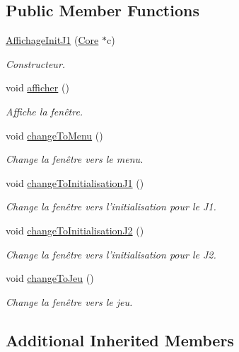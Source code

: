 \subsection*{Public Member Functions}
\begin{DoxyCompactItemize}
\item 
\hyperlink{classAffichageInitJ1_ac184edfaeebae278b71348584817cf3f}{Affichage\+Init\+J1} (\hyperlink{classCore}{Core} $\ast$c)
\begin{DoxyCompactList}\small\item\em Constructeur. \end{DoxyCompactList}\item 
void \hyperlink{classAffichageInitJ1_a469000a4072c712f88ee75ed6cc03d3b}{afficher} ()
\begin{DoxyCompactList}\small\item\em Affiche la fenêtre. \end{DoxyCompactList}\item 
void \hyperlink{classAffichageInitJ1_ac579f8933a11bc3e49923d414b20acab}{change\+To\+Menu} ()
\begin{DoxyCompactList}\small\item\em Change la fenêtre vers le menu. \end{DoxyCompactList}\item 
void \hyperlink{classAffichageInitJ1_a07ee576320b2bd22733ac142fd10b14c}{change\+To\+Initialisation\+J1} ()
\begin{DoxyCompactList}\small\item\em Change la fenêtre vers l'initialisation pour le J1. \end{DoxyCompactList}\item 
void \hyperlink{classAffichageInitJ1_ad1f6286f0aa162fec476d69049a2c1a8}{change\+To\+Initialisation\+J2} ()
\begin{DoxyCompactList}\small\item\em Change la fenêtre vers l'initialisation pour le J2. \end{DoxyCompactList}\item 
void \hyperlink{classAffichageInitJ1_a4fcbe1401407498fc32e5cedf797a9e4}{change\+To\+Jeu} ()
\begin{DoxyCompactList}\small\item\em Change la fenêtre vers le jeu. \end{DoxyCompactList}\end{DoxyCompactItemize}
\subsection*{Additional Inherited Members}


